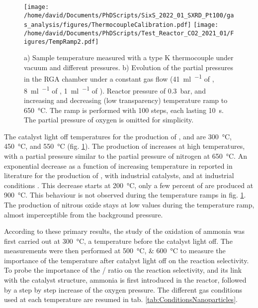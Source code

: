 \begin{figure}[!htb]
    \centering
    \texttt{[image: /home/david/Documents/PhDScripts/SixS\_2022\_01\_SXRD\_Pt100/gas\_analysis/figures/ThermocoupleCalibration.pdf]}
    \texttt{[image: /home/david/Documents/PhDScripts/Test\_Reactor\_CO2\_2021\_01/Figures/TempRamp2.pdf]}
    \caption{
        a) Sample temperature measured with a type K thermocouple under vacuum and different  pressures.
        b) Evolution of the partial pressures in the RGA chamber under a constant gas flow (\qty{41}{\ml\per\min} of , \qty{8}{\ml\per\min} of , \qty{1}{\ml\per\min} of ).
        Reactor pressure of \qty{0.3}{\bar}, and increasing and decreasing (low transparency) temperature ramp to \qty{650}{\degreeCelsius}.
        The ramp is performed with 100 steps, each lasting \qty{10}{\second}.
        The partial pressure of oxygen is omitted for simplicity.
    }
    \label{fig:TempRamps}
\end{figure}

The catalyst light off temperatures for the production of ,  and  are \qty{300}{\degreeCelsius}, \qty{450}{\degreeCelsius}, and \qty{550}{\degreeCelsius} (fig. \ref{fig:TempRamps}).
The production of  increases at high temperatures, with a partial pressure similar to the partial pressure of nitrogen at \qty{650}{\degreeCelsius}.
An exponential decrease as a function of increasing temperature in reported in literature for the production of , with industrial catalysts, and at industrial conditions \parencite{Hatscher2008}.
This decrease starts at \qty{200}{\degreeCelsius}, only a few percent of  are produced at \qty{900}{\degreeCelsius}.
This behaviour is not observed during the temperature ramps in fig. \ref{fig:TempRamps}.
The production of nitrous oxide stays at low values during the temperature ramp, almost imperceptible from the background pressure.

According to these primary results, the study of the oxidation of ammonia was first carried out at \qty{300}{\degreeCelsius}, a temperature before the catalyst light off.
The measurements were then performed at \qtylist{500; 600}{\degreeCelsius} to measure the importance of the temperature after catalyst light off on the reaction selectivity.
To probe the importance of the / ratio on the reaction selectivity, and its link with the catalyst structure, ammonia is first introduced in the reactor, followed by a step by step increase of the oxygen pressure.
The different gas conditions used at each temperature are resumed in tab. \ref{tab:ConditionsNanoparticles}.

